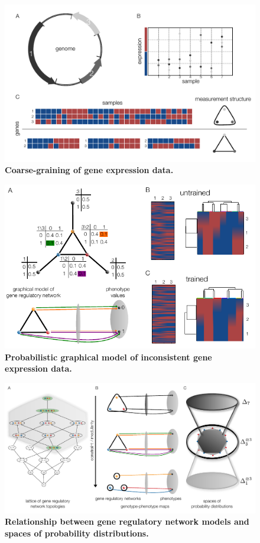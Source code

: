 \begin{figure}[!ht]
\centering
\noindent\includegraphics[width=0.9\columnwidth]{fig/figure_expression_concept.pdf}
\caption{{\bf Coarse-graining of gene expression data.}}
\label{fig:expression_concept}
\end{figure}

\begin{figure}[!ht]
\centering
\noindent\includegraphics[width=0.9\columnwidth]{fig/inconsistentthreecycle.pdf}
\caption{{\bf Probabilistic graphical model of inconsistent gene expression data.}}
\label{fig:inconsistentthreecycle}
\end{figure}

\begin{figure}[!ht]
\centering
\noindent\includegraphics[width=0.9\columnwidth]{fig/conediagram.pdf}
\caption{{\bf Relationship between gene regulatory network models and spaces of probability distributions.}}
\label{fig:conediagram}
\end{figure}

